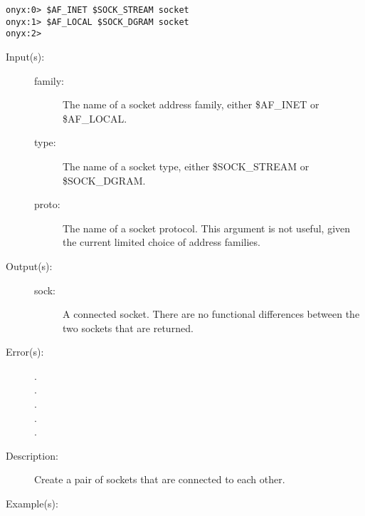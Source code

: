 \begin{description}
\begin{description}
\begin{verbatim}
onyx:0> $AF_INET $SOCK_STREAM socket
onyx:1> $AF_LOCAL $SOCK_DGRAM socket
onyx:2>
		\end{verbatim}
	\end{description}
\label{systemdict:socketpair}
\item[{\onyxop{family type proto}{socketpair}{sock sock}}: ]
\item[{\onyxop{family type}{socketpair}{sock sock}}: ]
	\begin{description}\item[]
	\item[Input(s): ]
		\begin{description}\item[]
		\item[family: ]
			The name of a socket address family, either \$AF\_INET
			or \$AF\_LOCAL.
		\item[type: ]
			The name of a socket type, either \$SOCK\_STREAM or
			\$SOCK\_DGRAM.
		\item[proto: ]
			The name of a socket protocol.  This argument is not
			useful, given the current limited choice of address
			families.
		\end{description}
	\item[Output(s): ]
		\begin{description}\item[]
		\item[sock: ]
			A connected socket.  There are no functional differences
			between the two sockets that are returned.
		\end{description}
	\item[Error(s): ]
		\begin{description}\item[]
		\item[.]
		\item[.]
		\item[.]
		\item[.]
		\item[.]
		\end{description}
	\item[Description: ]
		Create a pair of sockets that are connected to each other.
	\item[Example(s): ]\begin{verbatim}


\end{verbatim}
\end{description}
\end{description}
